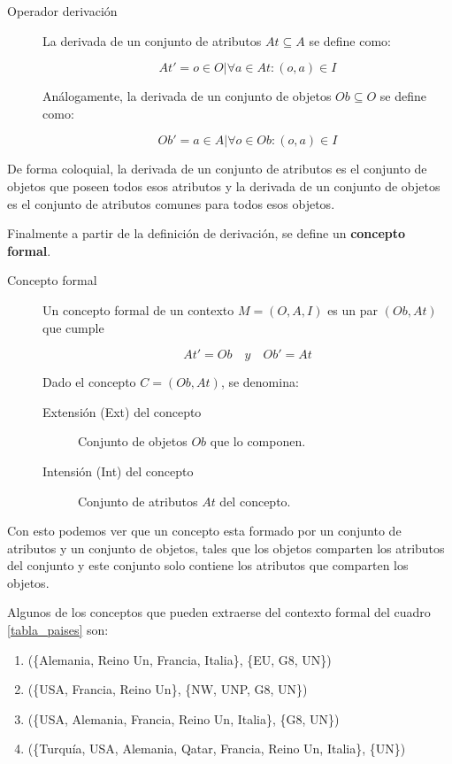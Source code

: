 	\begin{description}
		\item[Operador derivación] La derivada de un conjunto de atributos $At \subseteq A$ se define como: 
		
		\[ At' = {o \in O | \forall a \in At : (o, a) \in I} \]
		
		Análogamente, la derivada de un conjunto de objetos $Ob \subseteq O$ se define como:
		
		\[ Ob' = {a \in A | \forall o \in Ob : (o, a) \in I} \]
		
	\end{description}

	De forma coloquial, la derivada de un conjunto de atributos es el conjunto de objetos que poseen todos esos atributos y la derivada de un conjunto de objetos es el conjunto de atributos comunes para todos esos objetos.
	
	
	Finalmente a partir de la definición de derivación, se define un \textbf{concepto formal}.
	
	\begin{description}
		\item[Concepto formal] Un concepto formal de un contexto $M = (O,A,I)$ es un par $(Ob,At)$ que cumple
		
		\[ At' = Ob \quad y \quad Ob' = At		\] 
		
		Dado el concepto $C = (Ob, At)$, se denomina: 
		\begin{description}
			\item[Extensión (Ext) del concepto] Conjunto de objetos $Ob$ que lo componen.
			\item[Intensión (Int) del concepto] Conjunto de atributos $At$ del concepto. 
		\end{description}
	\end{description}

	
	Con esto podemos ver que un concepto esta formado por un conjunto de atributos y un conjunto de objetos, tales que los objetos comparten los atributos del conjunto y este conjunto solo contiene los atributos que comparten los objetos.
	
	Algunos de los conceptos que pueden extraerse del contexto formal del cuadro \ref{tabla_paises} son:
	
	\begin{enumerate}
		\item (\{Alemania, Reino Un, Francia, Italia\}, \{EU, G8, UN\}) 
		\item (\{USA, Francia, Reino Un\}, \{NW, UNP, G8, UN\})
		\item (\{USA, Alemania, Francia, Reino Un, Italia\}, \{G8, UN\})

		\item (\{Turquía, USA, Alemania, Qatar, Francia, Reino Un, Italia\}, \{UN\})
	\end{enumerate}
	
